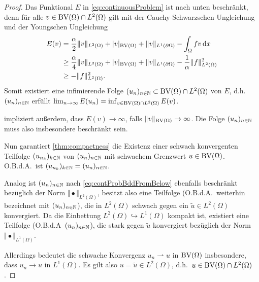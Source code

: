 \begin{proof}
  Das Funktional $E$ in \eqref{eq:continuousProblem} ist nach unten beschränkt,
  denn für alle $v\in \textup{BV}(\Omega)\cap L^2(\Omega)$ gilt mit der Cauchy-Schwarzschen
  Ungleichung und der Youngschen Ungleichung
  \begin{equation}
    \label{eq:contProbBddFromBelow}
    \begin{aligned}
      E(v)&=\frac{\alpha}{2}\Vert v\Vert_{L^2(\Omega)} + |v|_{\textup{BV}(\Omega)}
      +\Vert v\Vert_{L^1(\partial\Omega)}-\int_\Omega fv\,\mathrm{d}x\\
      &\geq 
      \frac{\alpha}{4}\Vert v\Vert_{L^2(\Omega)} + |v|_{\textup{BV}(\Omega)}
      +\Vert v\Vert_{L^1(\partial\Omega)}-\frac{1}{\alpha}\Vert
      f\Vert_{L^2(\Omega)}^2\\
      &\geq -\Vert f\Vert_{L^2(\Omega)}^2.
    \end{aligned}
  \end{equation}
  Somit existiert eine infimierende Folge
  $(u_n)_{n\in\mathbb{N}}\subset\textup{BV}(\Omega)\cap
  L^2(\Omega)$ von $E$, d.h.\ $(u_n)_{n\in\mathbb{N}}$ erfüllt
  $\lim_{n\rightarrow\infty}E(u_n) =
  \inf_{v\in\textup{BV}(\Omega)\cap
    L^2(\Omega)}E(v)$. 

   impliziert außerdem, dass
  $E(v)\rightarrow\infty$, falls
  $\Vert v\Vert_{\textup{BV}(\Omega)}\rightarrow\infty$.
  Die Folge $(u_n)_{n\in\mathbb{N}}$ muss also insbesondere beschränkt sein.

  \medbreak
  Nun garantiert \cref{thm:compactness} die Existenz einer schwach konvergenten
  Teilfolge $(u_{n_k})_{k\in\mathbb{N}}$ von $(u_n)_{n\in\mathbb{N}}$ mit schwachem Grenzwert
  $u\in\textup{BV}(\Omega)$. O.B.d.A.\ ist $(u_{n_k})_{k\in\mathbb{N}}=(u_n)_{n\in\mathbb{N}}$.

  Analog ist $(u_n)_{n\in\mathbb{N}}$ nach \cref{eq:contProbBddFromBelow} ebenfalls
  beschränkt bezüglich der Norm $\Vert\bullet\Vert_{L^2(\Omega)}$, besitzt also
  eine Teilfolge (O.B.d.A.\ weiterhin bezeichnet mit $(u_n)_{n\in\mathbb{N}}$), die
  in $L^2(\Omega)$ schwach gegen ein $\tilde{u}\in L^2(\Omega)$ konvergiert.
  Da die Einbettung $L^2(\Omega)\hookrightarrow L^1(\Omega)$ kompakt ist, 
  existiert eine Teilfolge (O.B.d.A\ $(u_n)_{n\in\mathbb{N}}$), die stark gegen
  $\tilde u$ konvergiert bezüglich der Norm $\Vert\bullet\Vert_{L^1(\Omega)}$.

  Allerdings bedeutet die schwache Konvergenz $u_n\rightharpoonup u$ in
  $\textup{BV}(\Omega)$  
  insbesondere, dass $u_n\rightarrow u$ in $L^1(\Omega)$.
  Es gilt also $u=\tilde u \in L^2(\Omega)$, d.h.\ $u\in\textup{BV}(\Omega)\cap
  L^2(\Omega)$.


\end{proof}

